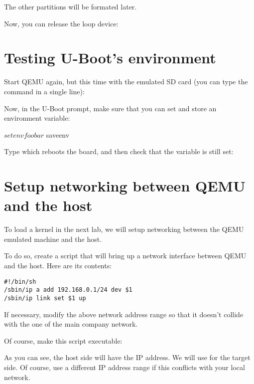 
The other partitions will be formated later.

Now, you can release the loop device:

\section{Testing U-Boot's environment}

Start QEMU again, but this time with the emulated SD card
(you can type the command in a single line):


Now, in the U-Boot prompt, make sure that you can set and store an environment variable:

\begin{bashinput}
$ setenv foo bar
$ saveenv
\end{bashinput}

Type  which reboots the board, and then check that the
 variable is still set:


\section{Setup networking between QEMU and the host}

To load a kernel in the next lab, we will setup networking between the QEMU emulated
machine and the host.

To do so, create a  script that will bring up a
network interface between QEMU and the host.  Here are its contents:

\begin{verbatim}
#!/bin/sh
/sbin/ip a add 192.168.0.1/24 dev $1
/sbin/ip link set $1 up
\end{verbatim}

If necessary, modify the above network address range so that
it doesn't collide with the one of the main company network.

Of course, make this script executable:

As you can see, the host side will have the  IP
address. We will use  for the target side.
Of course, use a different IP address range if this conflicts with your
local network.

